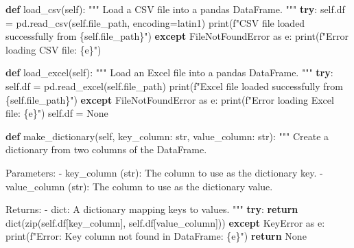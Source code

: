 \documentclass[
  letterpaper,
  DIV=11,
  numbers=noendperiod]{scrartcl}
\newenvironment{Shaded}{\begin{snugshade}}{\end{snugshade}}
\newcommand{\BuiltInTok}[1]{\textcolor[rgb]{0.00,0.23,0.31}{#1}}
\newcommand{\CommentTok}[1]{\textcolor[rgb]{0.37,0.37,0.37}{#1}}
\newcommand{\ControlFlowTok}[1]{\textcolor[rgb]{0.00,0.23,0.31}{\textbf{#1}}}
\newcommand{\ImportTok}[1]{\textcolor[rgb]{0.00,0.46,0.62}{#1}}
\newcommand{\KeywordTok}[1]{\textcolor[rgb]{0.00,0.23,0.31}{\textbf{#1}}}
\newcommand{\NormalTok}[1]{\textcolor[rgb]{0.00,0.23,0.31}{#1}}
\newcommand{\OperatorTok}[1]{\textcolor[rgb]{0.37,0.37,0.37}{#1}}
\newcommand{\PreprocessorTok}[1]{\textcolor[rgb]{0.68,0.00,0.00}{#1}}
\newcommand{\SpecialCharTok}[1]{\textcolor[rgb]{0.37,0.37,0.37}{#1}}
\newcommand{\SpecialStringTok}[1]{\textcolor[rgb]{0.13,0.47,0.30}{#1}}
\newcommand{\StringTok}[1]{\textcolor[rgb]{0.13,0.47,0.30}{#1}}
\newcommand{\VariableTok}[1]{\textcolor[rgb]{0.07,0.07,0.07}{#1}}
\begin{document}
\begin{Shaded}
\begin{Highlighting}[]
   
    \KeywordTok{def}\NormalTok{ load\_csv(}\VariableTok{self}\NormalTok{):}
        \CommentTok{"""}
\CommentTok{        Load a CSV file into a pandas DataFrame.}
\CommentTok{        """}
        \ControlFlowTok{try}\NormalTok{:}
            \VariableTok{self}\NormalTok{.df }\OperatorTok{=}\NormalTok{ pd.read\_csv(}\VariableTok{self}\NormalTok{.file\_path, encoding}\OperatorTok{=}\StringTok{\textquotesingle{}latin1\textquotesingle{}}\NormalTok{)}
            \BuiltInTok{print}\NormalTok{(}\SpecialStringTok{f"CSV file loaded successfully from }\SpecialCharTok{\{}\VariableTok{self}\SpecialCharTok{.}\NormalTok{file\_path}\SpecialCharTok{\}}\SpecialStringTok{"}\NormalTok{)}
        \ControlFlowTok{except} \PreprocessorTok{FileNotFoundError} \ImportTok{as}\NormalTok{ e:}
            \BuiltInTok{print}\NormalTok{(}\SpecialStringTok{f"Error loading CSV file: }\SpecialCharTok{\{}\NormalTok{e}\SpecialCharTok{\}}\SpecialStringTok{"}\NormalTok{)}

    
    \KeywordTok{def}\NormalTok{ load\_excel(}\VariableTok{self}\NormalTok{):}
        \CommentTok{"""}
\CommentTok{        Load an Excel file into a pandas DataFrame.}
\CommentTok{        """}
        \ControlFlowTok{try}\NormalTok{:}
            \VariableTok{self}\NormalTok{.df }\OperatorTok{=}\NormalTok{ pd.read\_excel(}\VariableTok{self}\NormalTok{.file\_path)}
            \BuiltInTok{print}\NormalTok{(}\SpecialStringTok{f"Excel file loaded successfully from }\SpecialCharTok{\{}\VariableTok{self}\SpecialCharTok{.}\NormalTok{file\_path}\SpecialCharTok{\}}\SpecialStringTok{"}\NormalTok{)}
        \ControlFlowTok{except} \PreprocessorTok{FileNotFoundError} \ImportTok{as}\NormalTok{ e:}
            \BuiltInTok{print}\NormalTok{(}\SpecialStringTok{f"Error loading Excel file: }\SpecialCharTok{\{}\NormalTok{e}\SpecialCharTok{\}}\SpecialStringTok{"}\NormalTok{)}
            \VariableTok{self}\NormalTok{.df }\OperatorTok{=} \VariableTok{None}


    \KeywordTok{def}\NormalTok{ make\_dictionary(}\VariableTok{self}\NormalTok{, key\_column: }\BuiltInTok{str}\NormalTok{, value\_column: }\BuiltInTok{str}\NormalTok{):}
        \CommentTok{"""}
\CommentTok{        Create a dictionary from two columns of the DataFrame.}

\CommentTok{        Parameters:}
\CommentTok{        {-} key\_column (str): The column to use as the dictionary key.}
\CommentTok{        {-} value\_column (str): The column to use as the dictionary value.}

\CommentTok{        Returns:}
\CommentTok{        {-} dict: A dictionary mapping keys to values.}
\CommentTok{        """}
        \ControlFlowTok{try}\NormalTok{:}
            \ControlFlowTok{return} \BuiltInTok{dict}\NormalTok{(}\BuiltInTok{zip}\NormalTok{(}\VariableTok{self}\NormalTok{.df[key\_column], }\VariableTok{self}\NormalTok{.df[value\_column])) }
        \ControlFlowTok{except} \PreprocessorTok{KeyError} \ImportTok{as}\NormalTok{ e:}
            \BuiltInTok{print}\NormalTok{(}\SpecialStringTok{f"Error: Key column not found in DataFrame: }\SpecialCharTok{\{}\NormalTok{e}\SpecialCharTok{\}}\SpecialStringTok{"}\NormalTok{)}
            \ControlFlowTok{return} \VariableTok{None}


\end{Highlighting}
\end{Shaded}
\end{document}
